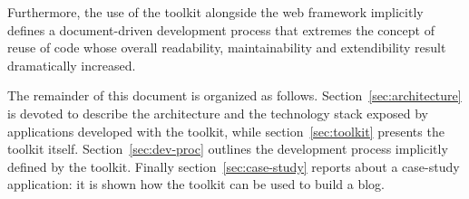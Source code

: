 Furthermore, the use of the toolkit alongside the web framework implicitly defines a document-driven development process that extremes the concept of reuse of code whose overall readability, maintainability and extendibility result dramatically increased.

The remainder of this document is organized as follows. Section~\ref{sec:architecture} is devoted to describe the architecture and the technology stack exposed by applications developed with the toolkit, while section~\ref{sec:toolkit} presents the toolkit itself. Section~\ref{sec:dev-proc} outlines the development process implicitly defined by the  toolkit. Finally section~\ref{sec:case-study} reports about a case-study application: it is shown how the toolkit can be used to build a blog.

